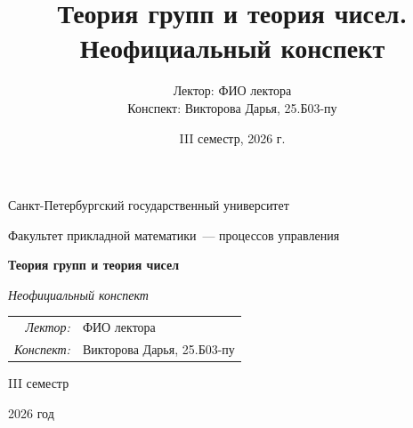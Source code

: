 \documentclass[12pt,a4paper]{report}
\title{Теория групп и теория чисел. Неофициальный конспект}
\author{Лектор: ФИО лектора\\
Конспект: Викторова Дарья, 25.Б03-пу}
\date{III семестр, 2026 г.}
\begin{document}
\begin{titlepage}
    \thispagestyle{empty}
    \begin{center}
        \vspace*{0.6cm}

        {\large Санкт-Петербургский государственный университет\par}
        \vspace{0.35em}
        {\normalsize Факультет прикладной математики~--- процессов управления\par}

        \vspace*{5.1cm}

        {\fontsize{30}{35}\selectfont\bfseries Теория групп и теория чисел\par}
        \vspace{0.65em}
        {\fontsize{17}{21}\selectfont\itshape Неофициальный конспект\par}

        \vspace{2.7cm}

        {\normalsize
        \begin{tabular}{@{}rl@{}}
            \textit{Лектор:} & ФИО лектора \\
            \textit{Конспект:} & Викторова Дарья, 25.Б03-пу
        \end{tabular}\par}

        \vfill

        {\large III семестр\par}
        \vspace{0.22em}
        {\large 2026 год\par}
        \vspace*{0.55cm}
    \end{center}
\end{titlepage}

\tableofcontents
\newpage

\setcounter{lection}{0}

\end{document}
